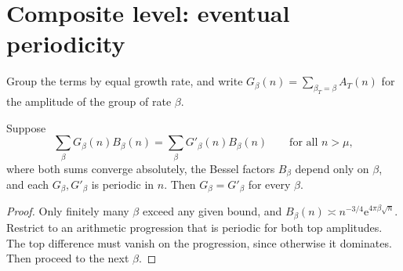 \documentclass[11pt]{amsart}
\newcommand{\e}{\mathrm e}\newcommand{\Z}{\mathbb Z}
\begin{document}
\section{Composite level: eventual periodicity}
Group the terms by equal growth rate, and write $G_\beta(n)=\sum_{\beta_T=\beta}A_T(n)$ for the amplitude of the group of rate $\beta$.

\begin{lemma}\label{lem:unique}
Suppose
\[
\sum_\beta G_\beta(n)B_\beta(n)=\sum_\beta G'_\beta(n)B_\beta(n)\qquad\text{for all } n>\mu,
\]
where both sums converge absolutely, the Bessel factors $B_\beta$ depend only on $\beta$, and each $G_\beta,G'_\beta$ is periodic in $n$. Then $G_\beta=G'_\beta$ for every $\beta$.
\end{lemma}
\begin{proof}
Only finitely many $\beta$ exceed any given bound, and $B_\beta(n)\asymp n^{-3/4}\e^{4\pi\beta\sqrt n}$. Restrict to an arithmetic progression that is periodic for both top amplitudes. The top difference must vanish on the progression, since otherwise it dominates. Then proceed to the next $\beta$.
\end{proof}
\end{document}
